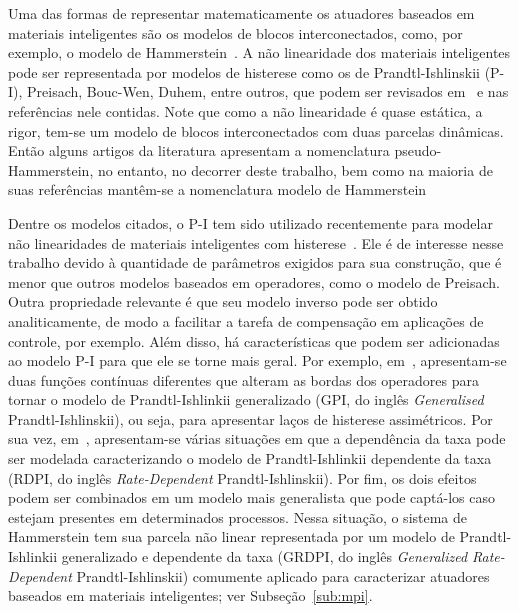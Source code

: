 \par 
Uma das formas de representar matematicamente os atuadores baseados em materiais inteligentes são os modelos de blocos interconectados, como, por exemplo, o modelo de Hammerstein~\citep{wang2012,aljanaideh2019}. A não linearidade dos materiais inteligentes pode ser representada por modelos de histerese como os de Prandtl-Ishlinskii (\acs{P-I}), Preisach, Bouc-Wen, Duhem, entre outros, que podem ser revisados em~\citep{gan2019} e nas referências nele contidas. Note que como a não linearidade é quase estática, a rigor, tem-se um modelo de blocos interconectados com duas parcelas dinâmicas. Então alguns artigos da literatura apresentam a nomenclatura pseudo-Hammerstein, no entanto, no decorrer deste trabalho, bem como na maioria de suas referências mantêm-se a nomenclatura modelo de Hammerstein 
\par 
Dentre os modelos citados, o \acs{P-I} tem sido utilizado recentemente para modelar não linearidades de materiais inteligentes com histerese~\citep{gan2016,qin2017,aljanaideh2018,wang2020,aljanaideh2022}. Ele é de interesse nesse trabalho devido à quantidade de parâmetros exigidos para sua construção, que é menor que outros modelos baseados em operadores, como o modelo de Preisach. Outra propriedade relevante é que seu modelo inverso pode ser obtido analiticamente, de modo a facilitar a tarefa de compensação em aplicações de controle, por exemplo. Além disso, há características que podem ser adicionadas ao modelo \acs{P-I} para que ele se torne mais geral. Por exemplo, em~\citep{aljanaideh2023}, apresentam-se duas funções contínuas diferentes que alteram as bordas dos operadores para tornar o modelo de Prandtl-Ishlinkii generalizado (\acs{GPI}, do inglês \textit{Generalised} Prandtl-Ishlinskii), ou seja, para apresentar laços de histerese assimétricos. Por sua vez, em~\citep{aljanaideh2007}, apresentam-se várias situações em que a dependência da taxa pode ser modelada caracterizando o modelo de Prandtl-Ishlinkii dependente da taxa (\acs{RDPI}, do inglês \textit{Rate-Dependent} Prandtl-Ishlinskii). Por fim, os dois efeitos podem ser combinados em um modelo mais generalista que pode captá-los caso estejam presentes em determinados processos. Nessa situação, o sistema de Hammerstein tem sua parcela não linear representada por um modelo de Prandtl-Ishlinkii generalizado e dependente da taxa (\acs{GRDPI}, do inglês \textit{Generalized Rate-Dependent} Prandtl-Ishlinskii) comumente aplicado para caracterizar atuadores baseados em materiais inteligentes; ver Subseção~\ref{sub:mpi}. 
